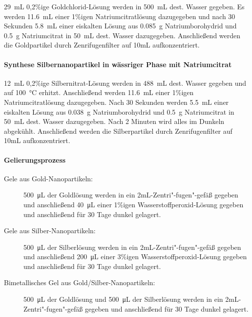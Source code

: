 			\SI{29}{\milli\liter} 0,2\%ige Goldchlorid-Lösung werden in \SI{500}{\milli\liter} dest. Wasser gegeben.
			Es werden \SI{11,6}{\milli\liter} einer 1\%igen Natriumcitratlösung dazugegeben und nach 30 Sekunden \SI{5,8}{\milli\liter}	einer eiskalten Lösung aus \SI{0,085}{\gram} Natriumborohydrid und \SI{0,5}{\gram} Natriumcitrat in \SI{50}{\milli\liter} dest. Wasser dazugegeben.
			Anschließend werden die Goldpartikel durch Zenrifugenfilter auf 10mL aufkonzentriert.
			
			\paragraph{Synthese Silbernanopartikel in wässriger Phase mit Natriumcitrat}
			
			\SI{12}{\milli\liter} 0,2\%ige Silbernitrat-Lösung werden in \SI{488}{\milli\liter} dest. Wasser gegeben und auf \SI{100}{\degreeCelsius} erhitzt.
			Anschließend werden \SI{11,6}{\milli\liter} einer 1\%igen Natriumcitratlösung dazugegeben.
			Nach 30 Sekunden werden  \SI{5,5}{\milli\liter}	einer eiskalten Lösung aus \SI{0,038}{\gram} Natriumborohydrid und \SI{0,5}{\gram} Natriumcitrat in \SI{50}{\milli\liter} dest. Wasser dazugegeben.
			Nach 2 Minuten wird alles im Dunkeln abgekühlt.
			Anschließend werden die Silberpartikel durch Zenrifugenfilter auf 10mL aufkonzentriert.
			
			\paragraph{Gelierungsprozess}
			    \begin{description}
			    \item[Gele aus Gold-Nanopartikeln:]
			    \SI{500}{\micro\liter} der Goldlösung werden in ein 2mL-Zentri"-fugen"-gefäß gegeben und anschließend \SI{40}{\micro\liter} einer 1\%igen Wasserstoffperoxid-Lösung gegeben und anschließend für 30 Tage dunkel gelagert.
			    \item[Gele aus Silber-Nanopartikeln:]
			    \SI{500}{\micro\liter} der Silberlösung werden in ein 2mL-Zentri"-fugen"-gefäß gegeben und anschließend \SI{200}{\micro\liter} einer 3\%igen Wasserstoffperoxid-Lösung gegeben und anschließend für 30 Tage dunkel gelagert.
			    \item[Bimetallisches Gel aus Gold/Silber-Nanopartikeln:]
			    \SI{500}{\micro\liter} der Goldlösung und 	\SI{500}{\micro\liter} der Silberlösung werden in ein 2mL-Zentri"-fugen"-gefäß gegeben und anschließend für 30 Tage dunkel gelagert.
			    \end{description}
			   	
